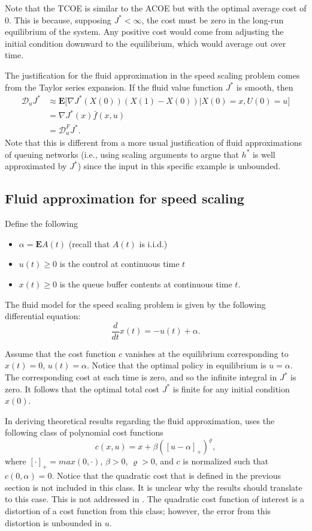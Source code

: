 \documentclass[11pt]{article}
\begin{document}
Note that the TCOE is similar to the ACOE but with the optimal average cost of 0. This is because, supposing $J^*<\infty$, the cost must be zero in the long-run equilibrium of the system. Any positive cost would come from adjusting the initial condition downward to the equilibrium, which would average out over time.

The justification for the fluid approximation in the speed scaling problem comes from the Taylor series expansion. If the fluid value function $J^*$ is smooth, then
$$\begin{aligned}
\mathcal{D}_u J^* &\approx \mathbf{E} \Big[ \nabla J^*(X(0))(X(1)-X(0)) \vert X(0)=x, U(0)=u \Big] \\
	&= \nabla J^*(x) \bar f(x,u) \\
	&= \mathcal{D}_u^F J^*.
\end{aligned}$$
Note that this is different from a more usual justification of fluid approximations of queuing networks (i.e., using scaling arguments to argue that $h^*$ is well approximated by $J^*$) since the input in this specific example is unbounded.




\subsection{Fluid approximation for speed scaling}

Define the following
\begin{itemize}
\item $\alpha = \mathbf{E} A(t)$ (recall that $A(t)$ is i.i.d.)
\item $u(t) \geq 0$ is the control at continuous time $t$
\item $x(t) \geq 0$ is the queue buffer contents at continuous time $t$.
\end{itemize}

The fluid model for the speed scaling problem is given by the following differential equation:
$$\frac{d}{dt} x(t) = -u(t) + \alpha.$$

Assume that the cost function $c$ vanishes at the equilibrium corresponding to $x(t)=0$, $u(t)=\alpha$. Notice that the optimal policy in equilibrium is $u=\alpha$. The corresponding cost at each time is zero, and so the infinite integral in $J^*$ is zero. It follows that the optimal total cost $J^*$ is finite for any initial condition $x(0)$.

In deriving theoretical results regarding the fluid approximation, \cite{paper} uses the following class of polynomial cost functions
$$c(x,u) = x + \beta([u-\alpha]_+)^\varrho,$$
where $[\cdot]_+ = max(0,\cdot)$, $\beta>0$, $\varrho>0$, and $c$ is normalized such that $c(0,\alpha)=0$. Notice that the quadratic cost that is defined in the previous section is not included in this class. It is unclear why the results should translate to this case. This is not addressed in \cite{paper}. The quadratic cost function of interest is a distortion of a cost function from this class; however, the error from this distortion is unbounded in $u$.
\end{document}
